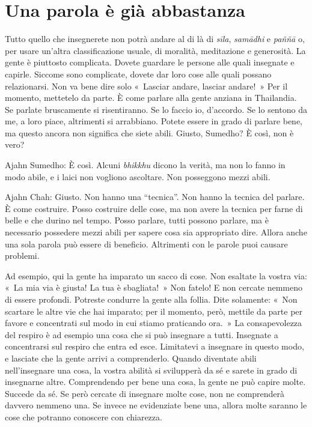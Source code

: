 \chapter{Una parola è già abbastanza}

Tutto quello che insegnerete non potrà andare al di là di \emph{sīla},
\emph{samādhi} e \emph{paññā} o, per usare un'altra classificazione
usuale, di moralità, meditazione e generosità. La gente è piuttosto
complicata. Dovete guardare le persone alle quali insegnate e capirle.
Siccome sono complicate, dovete dar loro cose alle quali possano
relazionarsi. Non va bene dire solo «~Lasciar andare, lasciar andare!~»
Per il momento, mettetelo da parte. È come parlare alla gente anziana in
Thailandia. Se parlate bruscamente si risentiranno. Se lo faccio io,
d'accordo. Se lo sentono da me, a loro piace, altrimenti si arrabbiano.
Potete essere in grado di parlare bene, ma questo ancora non significa
che siete abili. Giusto, Sumedho? È così, non è vero?

Ajahn Sumedho: È così. Alcuni \emph{bhikkhu} dicono la verità, ma non lo
fanno in modo abile, e i laici non vogliono ascoltare. Non posseggono
mezzi abili.

Ajahn Chah: Giusto. Non hanno una ``tecnica''. Non hanno la tecnica del
parlare. È come costruire. Posso costruire delle cose, ma non avere la
tecnica per farne di belle e che durino nel tempo. Posso parlare, tutti
possono parlare, ma è necessario possedere mezzi abili per sapere cosa
sia appropriato dire. Allora anche una sola parola può essere di
beneficio. Altrimenti con le parole puoi causare problemi.

Ad esempio, qui la gente ha imparato un sacco di cose. Non esaltate la
vostra via: «~La mia via è giusta! La tua è sbagliata!~» Non fatelo! E
non cercate nemmeno di essere profondi. Potreste condurre la gente alla
follia. Dite solamente: «~Non scartare le altre vie che hai imparato;
per il momento, però, mettile da parte per favore e concentrati sul modo
in cui stiamo praticando ora.~» La consapevolezza del respiro è ad
esempio una cosa che si può insegnare a tutti. Insegnate a concentrarsi
sul respiro che entra ed esce. Limitatevi a insegnare in questo modo, e
lasciate che la gente arrivi a comprenderlo. Quando diventate abili
nell'insegnare una cosa, la vostra abilità si svilupperà da sé e sarete
in grado di insegnarne altre. Comprendendo per bene una cosa, la gente
ne può capire molte. Succede da sé. Se però cercate di insegnare molte
cose, non ne comprenderà davvero nemmeno una. Se invece ne evidenziate
bene una, allora molte saranno le cose che potranno conoscere con
chiarezza.

